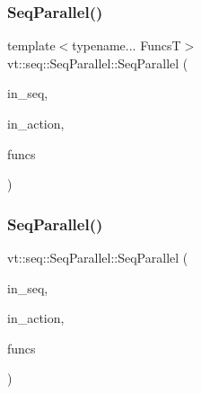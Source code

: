 \subsubsection{\texorpdfstring{Seq\+Parallel()}{SeqParallel()}\hspace{0.1cm}{\footnotesize\ttfamily [1/3]}}
{\footnotesize\ttfamily template$<$typename... FuncsT$>$ \\
vt\+::seq\+::\+Seq\+Parallel\+::\+Seq\+Parallel (\begin{DoxyParamCaption}\item[{\hyperlink{namespacevt_1_1seq_a3b612da217ac669d39c159f134ab8434}{Seq\+Type} const \&}]{in\+\_\+seq,  }\item[{\hyperlink{namespacevt_ae0a5a7b18cc99d7b732cb4d44f46b0f3}{Action\+Type}}]{in\+\_\+action,  }\item[{FuncsT \&\&...}]{funcs }\end{DoxyParamCaption})\hspace{0.3cm}{\ttfamily [inline]}}

\mbox{\label{structvt_1_1seq_1_1_seq_parallel_a1ba47a7c08c48604178a7aac55ddc9c1}} 
\subsubsection{\texorpdfstring{Seq\+Parallel()}{SeqParallel()}\hspace{0.1cm}{\footnotesize\ttfamily [2/3]}}
{\footnotesize\ttfamily vt\+::seq\+::\+Seq\+Parallel\+::\+Seq\+Parallel (\begin{DoxyParamCaption}\item[{\hyperlink{namespacevt_1_1seq_a3b612da217ac669d39c159f134ab8434}{Seq\+Type} const \&}]{in\+\_\+seq,  }\item[{\hyperlink{namespacevt_ae0a5a7b18cc99d7b732cb4d44f46b0f3}{Action\+Type}}]{in\+\_\+action,  }\item[{\hyperlink{structvt_1_1seq_1_1_seq_parallel_a5804979becb9986676dcba10487eb8de}{Seq\+Parallel\+Func\+Type}}]{funcs }\end{DoxyParamCaption})\hspace{0.3cm}{\ttfamily [inline]}}

\mbox{\label{structvt_1_1seq_1_1_seq_parallel_adaec7d806b4bc01e612fc1666a4c9107}} 
